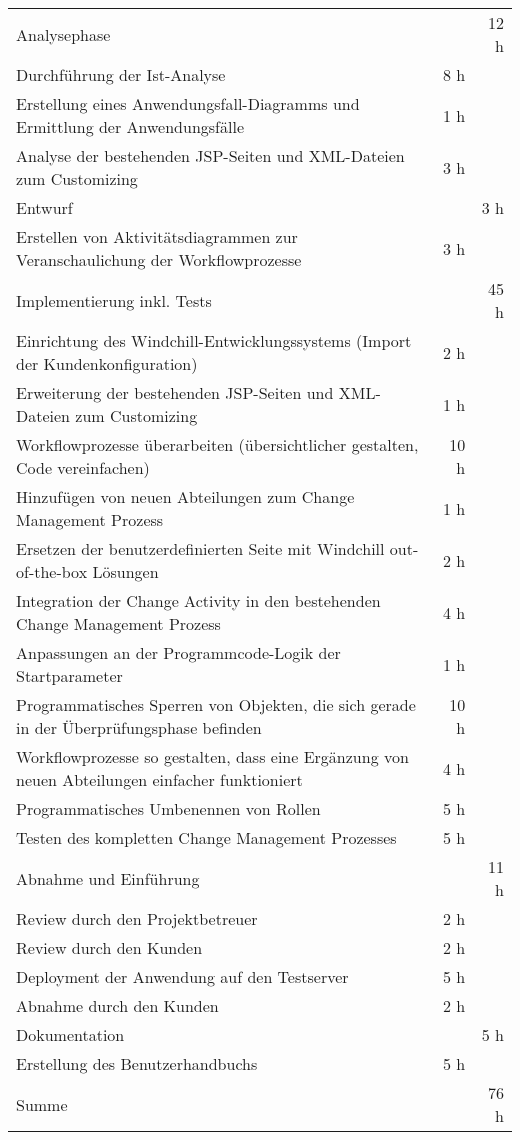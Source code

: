 \begin{tabularx}{\textwidth}{Xrr}
    \rowcolor{heading} Analysephase &       & 12 h \\
    Durchführung der Ist-Analyse & 8 h   &  \\
    \rowcolor{odd}Erstellung eines Anwendungsfall-Diagramms und Ermittlung der Anwendungsfälle & 1 h   &  \\
    Analyse der bestehenden JSP-Seiten und XML-Dateien zum Customizing & 3 h   &  \\
    \rowcolor{heading} Entwurf &       & 3 h \\
    Erstellen von Aktivitätsdiagrammen zur Veranschaulichung der Workflowprozesse & 3 h   &  \\
    \rowcolor{heading} Implementierung inkl. Tests &       & 45 h \\
    Einrichtung des Windchill-Entwicklungssystems (Import der Kundenkonfiguration) & 2 h   &  \\
    \rowcolor{odd}Erweiterung der bestehenden JSP-Seiten und XML-Dateien zum Customizing & 1 h   &  \\
    Workflowprozesse überarbeiten (übersichtlicher gestalten, Code vereinfachen) & 10 h  &  \\
    \rowcolor{odd}Hinzufügen von neuen Abteilungen zum Change Management Prozess & 1 h   &  \\
    Ersetzen der benutzerdefinierten Seite mit Windchill out-of-the-box Lösungen & 2 h   &  \\
    \rowcolor{odd}Integration der Change Activity in den bestehenden Change Management Prozess & 4 h   &  \\
    Anpassungen an der Programmcode-Logik der Startparameter & 1 h   &  \\
    \rowcolor{odd}Programmatisches Sperren von Objekten, die sich gerade in der Überprüfungsphase befinden & 10 h  &  \\
    Workflowprozesse so gestalten, dass eine Ergänzung von neuen Abteilungen einfacher funktioniert & 4 h   &  \\
    \rowcolor{odd}Programmatisches Umbenennen von Rollen & 5 h   &  \\
    Testen des kompletten Change Management Prozesses & 5 h   &  \\
    \rowcolor{heading} Abnahme und Einführung &       & 11 h \\
    Review durch den Projektbetreuer & 2 h   &  \\
    \rowcolor{odd}Review durch den Kunden & 2 h   &  \\
    Deployment der Anwendung auf den Testserver & 5 h   &  \\
    \rowcolor{odd}Abnahme durch den Kunden & 2 h   &  \\
    \rowcolor{heading} Dokumentation &       & 5 h \\
    Erstellung des Benutzerhandbuchs & 5 h   &  \\
    \midrule
    \rowcolor{heading} Summe &       & 76 h \\
\end{tabularx}%
